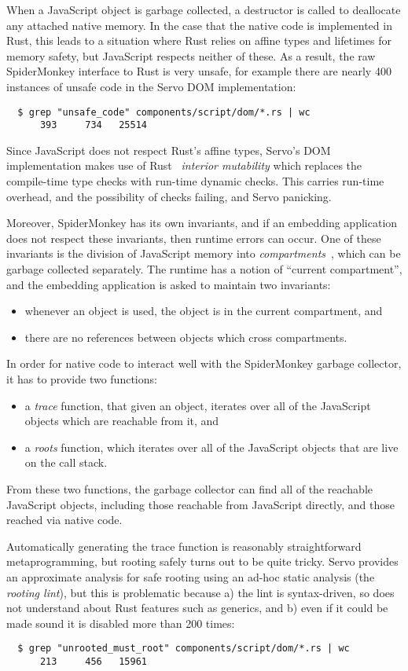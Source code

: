 When a JavaScript object is garbage collected, a destructor is called to
deallocate any attached native memory. In the case that the native code
is implemented in Rust, this leads to a situation where Rust relies on affine
types and lifetimes for memory safety, but JavaScript respects neither of these.
As a result, the raw SpiderMonkey interface to Rust is very unsafe,
for example there are nearly 400 instances of unsafe code in the Servo
DOM implementation:
\begin{verbatim}
  $ grep "unsafe_code" components/script/dom/*.rs | wc
      393     734   25514
\end{verbatim}
Since JavaScript does not respect Rust's affine types,
Servo's DOM implementation makes use of Rust~\cite[\S3.11]{rust}
\emph{interior mutability} which replaces the compile-time type
checks with run-time dynamic checks. This carries run-time overhead,
and the possibility of checks failing, and Servo panicking.

Moreover, SpiderMonkey has its own invariants, and if an embedding
application does not respect these invariants, then runtime errors can
occur. One of these invariants is the division of JavaScript memory
into \emph{compartments}~\cite{compartments}, which can be garbage collected
separately. The runtime has a notion of ``current compartment'',
and the embedding application is asked to maintain two invariants:
\begin{itemize}
  \item whenever an object is used, the object is in the current compartment, and
  \item there are no references between objects which cross compartments.
\end{itemize}
In order for native code to interact well with the SpiderMonkey garbage collector,
it has to provide two functions:
\begin{itemize}
\item a \emph{trace} function, that given an object, iterates over all of the
  JavaScript objects which are reachable from it, and
\item a \emph{roots} function, which iterates over all of the JavaScript
  objects that are live on the call stack.
\end{itemize}
From these two functions, the garbage collector can find all of the reachable
JavaScript objects, including those reachable from JavaScript directly, and
those reached via native code.

Automatically generating the trace function is reasonably straightforward
metaprogramming, but rooting safely turns out to be quite tricky.
Servo provides an approximate analysis for safe rooting using an ad-hoc
static analysis (the \emph{rooting lint}), but this is problematic because
a) the lint is syntax-driven, so does not understand about Rust features
such as generics, and b) even if it could be made sound it is disabled
more than 200 times:
\begin{verbatim}
  $ grep "unrooted_must_root" components/script/dom/*.rs | wc
      213     456   15961
\end{verbatim}

